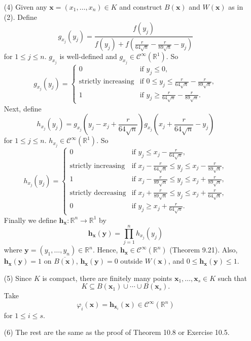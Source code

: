 \documentclass{article}
\begin{document}
\begin{enumerate}
\item[(4)]
  Given any $\mathbf{x} = (x_1,\ldots,x_n) \in K$
  and construct $B(\mathbf{x})$ and $W(\mathbf{x})$ as in (2).
  Define
  \[
    g_{x_j}(y_j)
    = \frac{f(y_j)}{f(y_j)+f\left(\frac{r}{64\sqrt{n}}-\frac{r}{89\sqrt{n}}-y_j\right)}
  \]
  for $1 \leq j \leq n$.
  $g_{x_j}$ is well-defined and $g_{x_j} \in \mathscr{C}^{\infty}(\mathbb{R}^1)$.
  So
  \begin{equation*}
    g_{x_j}(y_j) =
    \begin{cases}
      0
        & \text{if } y_j \leq 0, \\
      \text{strictly increasing}
        & \text{if } 0 \leq y_j \leq \frac{r}{64\sqrt{n}} - \frac{r}{89\sqrt{n}}, \\
      1
        & \text{if } y_j \geq \frac{r}{64\sqrt{n}} - \frac{r}{89\sqrt{n}}.
    \end{cases}
  \end{equation*}
  Next, define
  \[
    h_{x_j}(y_j)
    = g_{x_j}\left(y_j-x_j+\frac{r}{64\sqrt{n}}\right)
      g_{x_j}\left(x_j+\frac{r}{64\sqrt{n}}-y_j\right)
  \]
  for $1 \leq j \leq n$.
  $h_{x_j} \in \mathscr{C}^{\infty}(\mathbb{R}^1)$.
  So
  \begin{equation*}
    h_{x_j}(y_j) =
    \begin{cases}
      0
        & \text{if } y_j \leq x_j - \frac{r}{64\sqrt{n}}, \\
      \text{strictly increasing}
        & \text{if } x_j - \frac{r}{64\sqrt{n}} \leq y_j \leq x_j - \frac{r}{89\sqrt{n}}, \\
      1
        & \text{if } x_j - \frac{r}{89\sqrt{n}} \leq y_j \leq x_j + \frac{r}{89\sqrt{n}}, \\
      \text{strictly decreasing}
        & \text{if } x_j + \frac{r}{89\sqrt{n}} \leq y_j \leq x_j + \frac{r}{64\sqrt{n}}, \\
      0
        & \text{if } y_j \geq x_j + \frac{r}{64\sqrt{n}}.
    \end{cases}
  \end{equation*}
  Finally we define $\mathbf{h}_{\mathbf{x}}: \mathbb{R}^n \to \mathbb{R}^1$ by
  \[
    \mathbf{h}_{\mathbf{x}}(\mathbf{y})
    = \prod_{j=1}^{n} h_{x_j}(y_j)
  \]
  where $\mathbf{y} = (y_1,\ldots,y_n) \in \mathbb{R}^n$.
  Hence, $\mathbf{h}_{\mathbf{x}} \in \mathscr{C}^{\infty}(\mathbb{R}^n)$ (Theorem 9.21).
  Also, $\mathbf{h}_{\mathbf{x}}(\mathbf{y}) = 1$ on $\overline{B(\mathbf{x})}$,
  $\mathbf{h}_{\mathbf{x}}(\mathbf{y}) = 0$ outside $W(\mathbf{x})$,
  and $0 \leq \mathbf{h}_{\mathbf{x}}(\mathbf{y}) \leq 1$.

\item[(5)]
  Since $K$ is compact, there are finitely many points
  $\mathbf{x}_1, \ldots, \mathbf{x}_s \in K$ such that
  \[
    K \subseteq B(\mathbf{x}_1) \cup \cdots \cup B(\mathbf{x}_s).
  \]
  Take
  \[
    \varphi_i(\mathbf{x})
    = \mathbf{h}_{\mathbf{x}_i}(\mathbf{x})
    \in \mathscr{C}^{\infty}(\mathbb{R}^n)
  \]
  for $1 \leq i \leq s$.

\item[(6)]
  The rest are the same as the proof of Theorem 10.8 or Exercise 10.5.
\end{enumerate}
\end{document}
